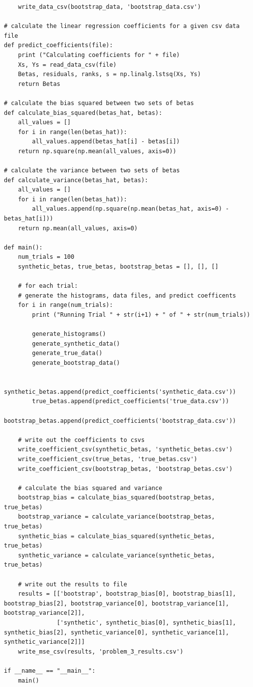 \documentclass[12pt]{article}
\begin{document}
\begin{appendices}
\begin{lstlisting}
    write_data_csv(bootstrap_data, 'bootstrap_data.csv')    

# calculate the linear regression coefficients for a given csv data file
def predict_coefficients(file):
    print ("Calculating coefficients for " + file)
    Xs, Ys = read_data_csv(file)
    Betas, residuals, ranks, s = np.linalg.lstsq(Xs, Ys)
    return Betas

# calculate the bias squared between two sets of betas
def calculate_bias_squared(betas_hat, betas):
    all_values = []
    for i in range(len(betas_hat)):
        all_values.append(betas_hat[i] - betas[i])
    return np.square(np.mean(all_values, axis=0))

# calculate the variance between two sets of betas
def calculate_variance(betas_hat, betas):
    all_values = []
    for i in range(len(betas_hat)):
        all_values.append(np.square(np.mean(betas_hat, axis=0) - betas_hat[i]))
    return np.mean(all_values, axis=0)

def main():
    num_trials = 100
    synthetic_betas, true_betas, bootstrap_betas = [], [], []

    # for each trial:
    # generate the histograms, data files, and predict coefficents
    for i in range(num_trials):
        print ("Running Trial " + str(i+1) + " of " + str(num_trials))

        generate_histograms()
        generate_synthetic_data()
        generate_true_data()
        generate_bootstrap_data()

        synthetic_betas.append(predict_coefficients('synthetic_data.csv'))
        true_betas.append(predict_coefficients('true_data.csv'))
        bootstrap_betas.append(predict_coefficients('bootstrap_data.csv'))

    # write out the coefficients to csvs
    write_coefficient_csv(synthetic_betas, 'synthetic_betas.csv')
    write_coefficient_csv(true_betas, 'true_betas.csv')
    write_coefficient_csv(bootstrap_betas, 'bootstrap_betas.csv')

    # calculate the bias squared and variance
    bootstrap_bias = calculate_bias_squared(bootstrap_betas, true_betas)
    bootstrap_variance = calculate_variance(bootstrap_betas, true_betas)
    synthetic_bias = calculate_bias_squared(synthetic_betas, true_betas)
    synthetic_variance = calculate_variance(synthetic_betas, true_betas)

    # write out the results to file
    results = [['bootstrap', bootstrap_bias[0], bootstrap_bias[1], bootstrap_bias[2], bootstrap_variance[0], bootstrap_variance[1], bootstrap_variance[2]],
               ['synthetic', synthetic_bias[0], synthetic_bias[1], synthetic_bias[2], synthetic_variance[0], synthetic_variance[1], synthetic_variance[2]]]
    write_mse_csv(results, 'problem_3_results.csv')

if __name__ == "__main__":
    main()
\end{lstlisting}

\end{appendices}
\end{document}
